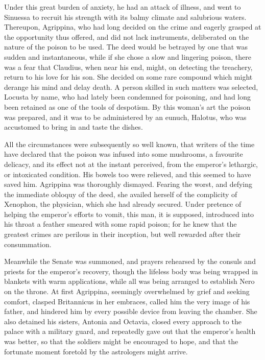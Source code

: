 
Under this great burden of anxiety, he had an attack of illness, and went to Sinuessa to recruit his strength with its balmy climate and salubrious waters. Thereupon, Agrippina, who had long decided on the crime and eagerly grasped at the opportunity thus offered, and did not lack instruments, deliberated on the nature of the poison to be used. The deed would be betrayed by one that was sudden and instantaneous, while if she chose a slow and lingering poison, there was a fear that Claudius, when near his end, might, on detecting the treachery, return to his love for his son. She decided on some rare compound which might derange his mind and delay death. A person skilled in such matters was selected, Locusta by name, who had lately been condemned for poisoning, and had long been retained as one of the tools of despotism. By this woman's art the poison was prepared, and it was to be administered by an eunuch, Halotus, who was accustomed to bring in and taste the dishes.


All the circumstances were subsequently so well known, that writers of the time have declared that the poison was infused into some mushrooms, a favourite delicacy, and its effect not at the instant perceived, from the emperor's lethargic, or intoxicated condition. His bowels too were relieved, and this seemed to have saved him. Agrippina was thoroughly dismayed. Fearing the worst, and defying the immediate obloquy of the deed, she availed herself of the complicity of Xenophon, the physician, which she had already secured. Under pretence of helping the emperor's efforts to vomit, this man, it is supposed, introduced into his throat a feather smeared with some rapid poison; for he knew that the greatest crimes are perilous in their inception, but well rewarded after their consummation.


Meanwhile the Senate was summoned, and prayers rehearsed by the consuls and priests for the emperor's recovery, though the lifeless body was being wrapped in blankets with warm applications, while all was being arranged to establish Nero on the throne. At first Agrippina, seemingly overwhelmed by grief and seeking comfort, clasped Britannicus in her embraces, called him the very image of his father, and hindered him by every possible device from leaving the chamber. She also detained his sisters, Antonia and Octavia, closed every approach to the palace with a military guard, and repeatedly gave out that the emperor's health was better, so that the soldiers might be encouraged to hope, and that the fortunate moment foretold by the astrologers might arrive.

